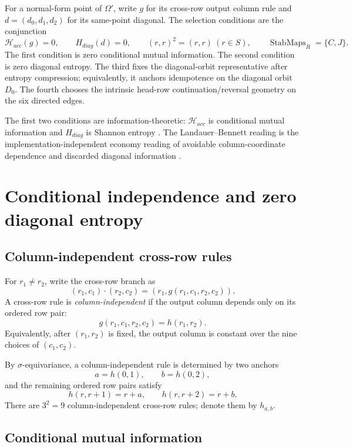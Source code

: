\documentclass[11pt]{article}
\theoremstyle{definition}
\begin{document}
For a normal-form point of \(\Omega'\), write \(g\) for its cross-row output
column rule and \(d=(d_0,d_1,d_2)\) for its same-point diagonal.  The selection conditions are
the conjunction
\[
\boxed{
\mathcal H_{acc}(g)=0,
\qquad
H_{diag}(d)=0,
\qquad
(r,r)^2=(r,r)\ (r\in S),
\qquad
\operatorname{StabMaps}_{R}=\{C,J\}.
}
\]
The first condition is zero conditional mutual information.  The second condition is
zero diagonal entropy.  The third fixes the diagonal-orbit representative after
entropy compression; equivalently, it anchors idempotence on the diagonal
orbit \(D_0\).  The fourth chooses the intrinsic head-row continuation/reversal
geometry on the six directed edges.

The first two conditions are information-theoretic: \(\mathcal H_{acc}\) is
conditional mutual information and \(H_{diag}\) is Shannon entropy
\cite{Shannon1948,CoverThomas2006}.  The Landauer--Bennett reading is the
implementation-independent economy reading of avoidable column-coordinate dependence
and discarded diagonal information
\cite{Landauer1961,Bennett1973,Bennett1982}.

\section{Conditional independence and zero diagonal entropy}\label{conditional-independence-zero-diagonal-entropy}

\subsection{Column-independent cross-row rules}\label{column-independent-rules}\label{column-independent-cross-row-rules}

For \(r_1\ne r_2\), write the cross-row branch as
\[
(r_1,c_1)\cdot(r_2,c_2)=(r_1,g(r_1,c_1,r_2,c_2)).
\]
A cross-row rule is \emph{column-independent} if the output column depends only on
its ordered row pair:
\[
g(r_1,c_1,r_2,c_2)=h(r_1,r_2).
\]
Equivalently, after \((r_1,r_2)\) is fixed, the output column is constant over
the nine choices of \((c_1,c_2)\).

By \(\sigma\)-equivariance, a column-independent rule is determined by two anchors
\[
a=h(0,1),
\qquad
b=h(0,2),
\]
and the remaining ordered row pairs satisfy
\[
h(r,r+1)=r+a,
\qquad
h(r,r+2)=r+b.
\]
There are \(3^2=9\) column-independent cross-row rules; denote them by
\(h_{a,b}\).

\subsection{Conditional mutual information}\label{conditional-mutual-information-selection}\label{conditional-mutual-information}\label{conditional-mutual-information-observable}
\end{document}
